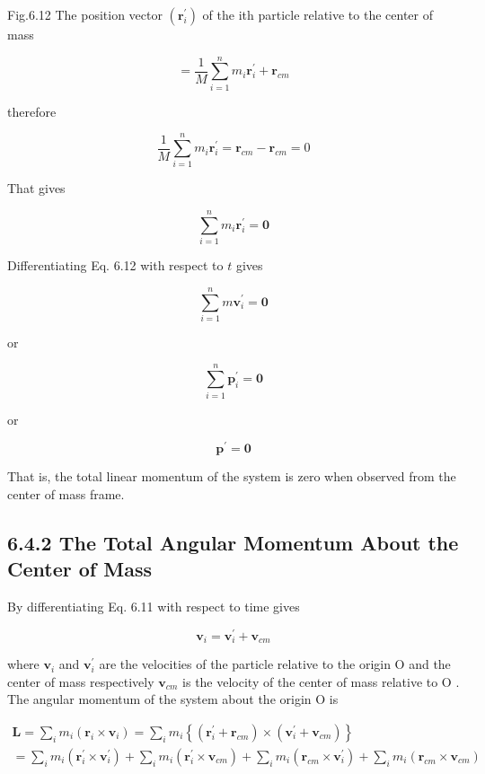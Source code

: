 \documentclass[10pt]{article}
\begin{document}
Fig.6.12 The position vector $\left(\mathbf{r}_{i}^{\prime}\right)$ of the ith particle relative to the center of mass

$$
=\frac{1}{M} \sum_{i=1}^{n} m_{i} \mathbf{r}_{i}^{\prime}+\mathbf{r}_{c m}
$$

therefore

$$
\frac{1}{M} \sum_{i=1}^{n} m_{i} \mathbf{r}_{i}^{\prime}=\mathbf{r}_{c m}-\mathbf{r}_{c m}=0
$$

That gives


\begin{equation*}
\sum_{i=1}^{n} m_{i} \mathbf{r}_{i}^{\prime}=\mathbf{0} \tag{6.12}
\end{equation*}


Differentiating Eq. 6.12 with respect to $t$ gives


\begin{equation*}
\sum_{i=1}^{n} m \mathbf{v}_{i}^{\prime}=\mathbf{0} \tag{6.13}
\end{equation*}


or

$$
\sum_{i=1}^{n} \mathbf{p}_{i}^{\prime}=\mathbf{0}
$$

or

$$
\mathbf{p}^{\prime}=\mathbf{0}
$$

That is, the total linear momentum of the system is zero when observed from the center of mass frame.

\subsection*{6.4.2 The Total Angular Momentum About the Center of Mass}
By differentiating Eq. 6.11 with respect to time gives


\begin{equation*}
\mathbf{v}_{i}=\mathbf{v}_{i}^{\prime}+\mathbf{v}_{c m} \tag{6.14}
\end{equation*}


where $\mathbf{v}_{i}$ and $\mathbf{v}_{i}^{\prime}$ are the velocities of the particle relative to the origin O and the center of mass respectively $\mathbf{v}_{c m}$ is the velocity of the center of mass relative to O . The angular momentum of the system about the origin O is

$$
\begin{gathered}
\mathbf{L}=\sum_{i} m_{i}\left(\mathbf{r}_{i} \times \mathbf{v}_{i}\right)=\sum_{i} m_{i}\left\{\left(\mathbf{r}_{i}^{\prime}+\mathbf{r}_{c m}\right) \times\left(\mathbf{v}_{i}^{\prime}+\mathbf{v}_{c m}\right)\right\} \\
=\sum_{i} m_{i}\left(\mathbf{r}_{i}^{\prime} \times \mathbf{v}_{i}^{\prime}\right)+\sum_{i} m_{i}\left(\mathbf{r}_{i}^{\prime} \times \mathbf{v}_{c m}\right)+\sum_{i} m_{i}\left(\mathbf{r}_{c m} \times \mathbf{v}_{i}^{\prime}\right)+\sum_{i} m_{i}\left(\mathbf{r}_{c m} \times \mathbf{v}_{c m}\right)
\end{gathered}
$$
\end{document}
